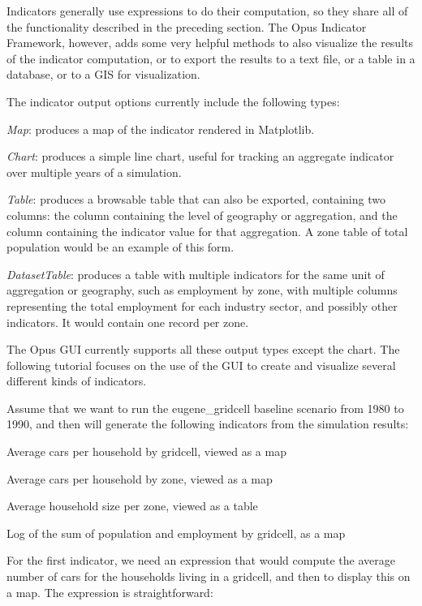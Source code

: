 Indicators generally use expressions to do their computation, so they
share all of the functionality described in the preceding section.  The
Opus Indicator Framework, however, adds some very helpful methods to
also visualize the results of the indicator computation, or to export
the results to a text file, or a table in a database, or to a GIS for
visualization.

The indicator output options currently include the following types:

\squishlist 
\item \emph{Map}: produces a map of the indicator rendered
in Matplotlib. 
\item \emph{Chart}: produces a simple line chart, useful for tracking
an aggregate indicator over multiple years of a simulation. 
\item \emph{Table}: produces a browsable table that can also be
exported, containing two columns: the column containing the level of geography or
aggregation, and the column containing the indicator value for that
aggregation.  A zone table of total population would be an example of
this form. 
\item \emph{DatasetTable}: produces a table with multiple
indicators for the same unit of aggregation or geography, such as
employment by zone, with multiple columns representing the total
employment for each industry sector, and possibly other indicators.  It
would contain one record per zone. 
\squishend

The Opus GUI currently supports all these output types except the
chart. The following tutorial focuses on the use of the GUI to
create and visualize several different kinds of indicators.

Assume that we want to run the eugene\_gridcell baseline scenario from
1980 to 1990, and then will generate the following indicators from the
simulation results:

\squishlist
\item Average cars per household by gridcell, viewed as a map
\item Average cars per household by zone, viewed as a map
\item Average household size per zone, viewed as a table
\item Log of the sum of population and employment by gridcell, as a map
\squishend

For the first indicator, we need an expression that would compute the
average number of cars for the households living in a gridcell, and
then to display this on a map.  The expression is straightforward:

